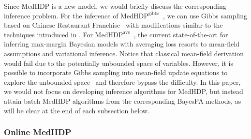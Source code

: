 \documentclass[twoside,11pt]{article}
\newcommand\MedHDPave{$\text{MedHDP}^{\text{ave}}$~}
\newcommand\MedHDPgibbs{$\text{MedHDP}^{\text{gibbs}}$~}
\begin{document}
Since MedHDP is a new model, we would briefly discuss the corresponding inference problem. For the inference of \MedHDPgibbs, we can use Gibbs sampling based on Chinese Restaurant Franchise~\citep{teh2006hierarchical, wang2012split} with  modifications similar to the techniques introduced in \cite{zhugibbs2013}. For \MedHDPave, the current state-of-the-art for inferring max-margin Bayesian models with averaging loss resorts to mean-field assumptions and variational inference. Notice that classical mean-field derivation would fail due to the potentially unbounded space of variables. However, it is possible to incorporate Gibbs sampling into mean-field update equations to explore the unbounded space~\citep{welling2008hybrid, wang2012truncation} and therefore bypass the difficulty. In this paper, we would not focus on developing inference algorithms for MedHDP, but instead attain batch MedHDP algorithms from the corresponding BayesPA methods, as will be clear at the end of each subsection below.


\subsubsection{Online MedHDP}
\end{document}
